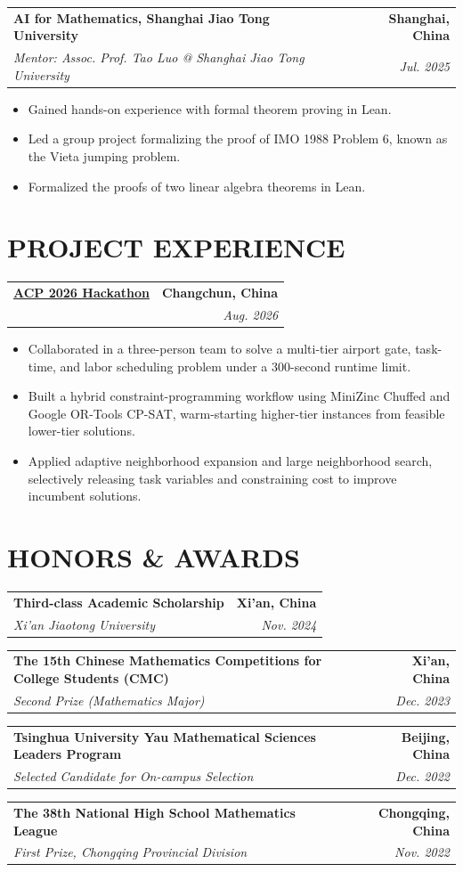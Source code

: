 \documentclass[a4paper,11pt]{article}
\makeatletter
\newcommand{\resumeSubheading}[4]{
  \vspace{2pt}
  \begin{tabular*}{\textwidth}{l@{\extracolsep{\fill}}r}
    \textbf{#1} & \textbf{#2} \\
    \textit{#3} & \textit{#4} \\
  \end{tabular*}
  \vspace{-4pt}
}
\newcommand{\resumeItem}[1]{
  \item\small{#1}
}
\newcommand{\resumeItemListStart}{
  \begin{itemize}[leftmargin=0.18in]
}
\newcommand{\resumeItemListEnd}{
  \end{itemize}\vspace{-4pt}
}
\makeatother
\begin{document}
\resumeSubheading
{AI for Mathematics, Shanghai Jiao Tong University}
{Shanghai, China}
{Mentor: Assoc. Prof. Tao Luo @ Shanghai Jiao Tong University}
{Jul. 2025}

\resumeItemListStart
  \resumeItem{Gained hands-on experience with formal theorem proving in Lean.}
  \resumeItem{Led a group project formalizing the proof of IMO 1988 Problem 6, known as the Vieta jumping problem.}
  \resumeItem{Formalized the proofs of two linear algebra theorems in Lean.}
\resumeItemListEnd

\section{PROJECT EXPERIENCE}

\resumeSubheading
{\href{https://github.com/zixiwang0o0/ACP2026}{ACP 2026 Hackathon}}
{Changchun, China}
{}
{Aug. 2026}

\resumeItemListStart
  \resumeItem{Collaborated in a three-person team to solve a multi-tier airport gate, task-time, and labor scheduling problem under a 300-second runtime limit.}
  \resumeItem{Built a hybrid constraint-programming workflow using MiniZinc Chuffed and Google OR-Tools CP-SAT, warm-starting higher-tier instances from feasible lower-tier solutions.}
  \resumeItem{Applied adaptive neighborhood expansion and large neighborhood search, selectively releasing task variables and constraining cost to improve incumbent solutions.}
\resumeItemListEnd

\section{HONORS \& AWARDS}

\resumeSubheading
{Third-class Academic Scholarship}
{Xi'an, China}
{Xi'an Jiaotong University}
{Nov. 2024}

\resumeSubheading
{The 15th Chinese Mathematics Competitions for College Students (CMC)}
{Xi'an, China}
{Second Prize (Mathematics Major)}
{Dec. 2023}

\resumeSubheading
{Tsinghua University Yau Mathematical Sciences Leaders Program}
{Beijing, China}
{Selected Candidate for On-campus Selection}
{Dec. 2022}


\resumeSubheading
{The 38th National High School Mathematics League}
{Chongqing, China}
{First Prize, Chongqing Provincial Division}
{Nov. 2022}
\end{document}
